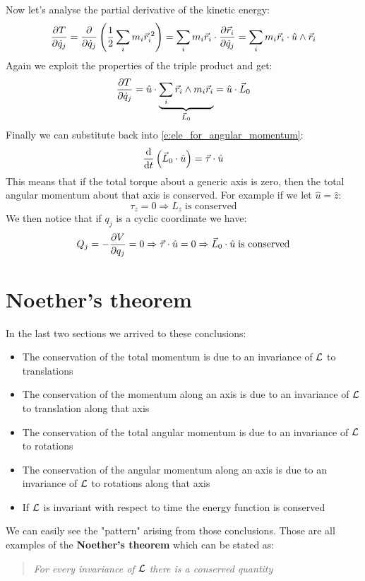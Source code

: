 Now let's analyse the partial derivative of the kinetic energy:
\begin{equation}
    \dfrac{\partial T}{\partial \dot{q}_j} = \dfrac{\partial }{\partial \dot{q}_j}\left(\dfrac{1}{2}\displaystyle\sum_i m_i \vec{r}_i^{\;2}\right) = \displaystyle\sum_i m_i \vec{r}_i \cdot \dfrac{\partial \vec{r}_i}{\partial \dot{q}_j} = \displaystyle\sum_i m_i \vec{r}_i \cdot \hat{u} \wedge \vec{r}_i
\end{equation}
Again we exploit the properties of the triple product and get:
\begin{equation}
    \dfrac{\partial T}{\partial \dot{q}_j} =   \hat{u} \cdot \underbrace{\displaystyle\sum_i \vec{r}_i \wedge m_i \vec{r}_i}_{\vec{L}_0} = \hat{u} \cdot \vec{L}_0
\end{equation}
Finally we can substitute back into \eqref{e:ele_for_angular_momentum}:
\begin{equation}
    \dfrac{\mathrm{d} }{\mathrm{d}t}\left(\vec{L}_0 \cdot \hat{u}\right) = \vec{\tau} \cdot \hat{u}
\end{equation}
This means that if the total torque about a generic axis is zero, then the total angular momentum about that axis is conserved. For example if we let $\hat{u} = \hat{z}$:
\begin{equation}
    \tau_z = 0 \Rightarrow L_z\;\text{is conserved}
\end{equation}
We then notice that if $q_j$ is a cyclic coordinate we have:
\begin{equation}
    Q_j = -\dfrac{\partial V}{\partial q_j} = 0 \Rightarrow \vec{\tau} \cdot \hat{u} = 0 \Rightarrow \vec{L}_0 \cdot \hat{u}\;\text{is conserved}
\end{equation}
\section{Noether's theorem}
In the last two sections we arrived to these conclusions:
\begin{itemize}
    \item The conservation of the total momentum is due to an invariance of $\mathcal{L}$ to translations
    \item The conservation of the momentum along an axis is due to an invariance of $\mathcal{L}$ to translation along that axis
    \item The conservation of the total angular momentum is due to an invariance of $\mathcal{L}$ to rotations
    \item The conservation of the angular momentum along an axis is due to an invariance of $\mathcal{L}$ to rotations along that axis
    \item If $\mathcal{L}$ is invariant with respect to time the energy function is conserved
\end{itemize}
We can easily see the "pattern" arising from those conclusions. Those are all examples of the \textbf{Noether's theorem} which can be stated as:
\begin{quotation}
    \textit{For every invariance of $\mathcal{L}$ there is a conserved quantity}
\end{quotation}
